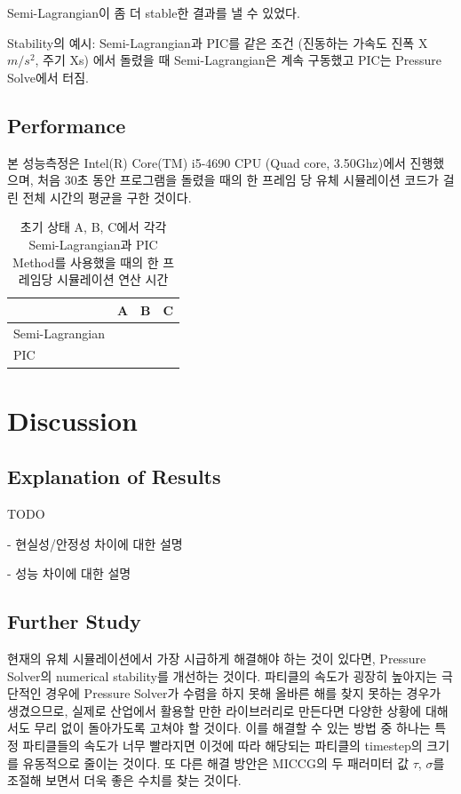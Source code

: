 \documentclass[10pt, A4]{article}
\begin{document}
Semi-Lagrangian이 좀 더 stable한 결과를 낼 수 있었다.

Stability의 예시: Semi-Lagrangian과 PIC를 같은 조건 (진동하는 가속도 진폭 X$m/s^2$, 주기 Xs) 에서 돌렸을 때 Semi-Lagrangian은 계속 구동했고 PIC는 Pressure Solve에서 터짐.
 
\subsection{Performance}

본 성능측정은 Intel(R) Core(TM) i5-4690 CPU (Quad core, 3.50Ghz)에서 진행했으며, 처음 30초 동안 프로그램을 돌렸을 때의 한 프레임 당 유체 시뮬레이션 코드가 걸린 전체 시간의 평균을 구한 것이다.

\begin{table}[h]
\centering
\begin{tabular}{|l|l|l|l|}
\hline
                & A & B & C \\ \hline
Semi-Lagrangian &   &   &   \\ \hline
PIC             &   &   &   \\ \hline
\end{tabular}
\caption{초기 상태 A, B, C에서 각각 Semi-Lagrangian과 PIC Method를 사용했을 때의 한 프레임당 시뮬레이션 연산 시간}
\end{table}

\section{Discussion}

\subsection{Explanation of Results}

TODO

- 현실성/안정성 차이에 대한 설명

- 성능 차이에 대한 설명

\subsection{Further Study}

현재의 유체 시뮬레이션에서 가장 시급하게 해결해야 하는 것이 있다면, Pressure Solver의 numerical stability를 개선하는 것이다. 파티클의 속도가 굉장히 높아지는 극단적인 경우에 Pressure Solver가 수렴을 하지 못해 올바른 해를 찾지 못하는 경우가 생겼으므로, 실제로 산업에서 활용할 만한 라이브러리로 만든다면 다양한 상황에 대해서도 무리 없이 돌아가도록 고쳐야 할 것이다. 이를 해결할 수 있는 방법 중 하나는 특정 파티클들의 속도가 너무 빨라지면 이것에 따라 해당되는 파티클의 timestep의 크기를 유동적으로 줄이는 것이다. \cite[p. 35]{fluid-sim-cg} 또 다른 해결 방안은 MICCG의 두 패러미터 값 $\tau$, $\sigma$를 조절해 보면서 더욱 좋은 수치를 찾는 것이다.
\end{document}
